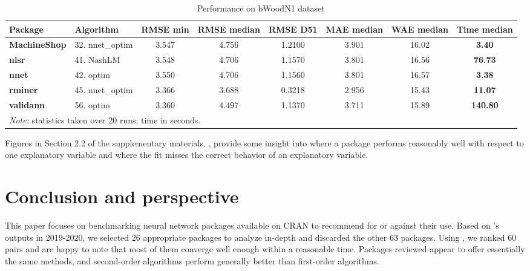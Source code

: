 \begin{Schunk}
\begin{table}

\caption{\label{tab:TOP10:bWoodN1}Performance on bWoodN1 dataset}
\centering
\fontsize{7}{9}\selectfont
\begin{tabular}[t]{>{}llccccc>{}c}
\toprule
Package & Algorithm & RMSE min & RMSE median & RMSE D51 & MAE median & WAE median & Time median\\
\midrule
\textbf{MachineShop} & 32. nnet\_optim & 3.547 & 4.756 & 1.2100 & 3.901 & 16.02 & \textbf{3.40}\\
\textbf{nlsr} & 41. NashLM & 3.548 & 4.706 & 1.1570 & 3.801 & 16.56 & \textbf{76.73}\\
\textbf{nnet} & 42. optim & 3.550 & 4.706 & 1.1560 & 3.801 & 16.57 & \textbf{3.38}\\
\textbf{rminer} & 45. nnet\_optim & 3.366 & 3.688 & 0.3218 & 2.956 & 15.43 & \textbf{11.07}\\
\textbf{validann} & 56. optim & 3.360 & 4.497 & 1.1370 & 3.711 & 15.89 & \textbf{140.80}\\
\bottomrule
\multicolumn{8}{l}{\rule{0pt}{1em}\textit{Note: } statistics taken over 20 runs; time in seconds.}\\
\end{tabular}
\end{table}

\end{Schunk}

Figures in Section 2.2 of the supplementary materials,
\citep{suppl:material:paper21}, provide some insight into where a
package performs reasonably well with respect to one explanatory
variable and where the fit misses the correct behavior of an explanatory
variable.

\hypertarget{conclusion-and-perspective}{%
\section{Conclusion and perspective}\label{conclusion-and-perspective}}

This paper focuses on benchmarking neural network packages available on
CRAN to recommend for or against their use. Based on 's
outputs in 2019-2020, we selected 26 appropriate packages to analyze
in-depth and discarded the other 63 packages. Using ,
we ranked 60  pairs and are happy to note that
most of them converge well enough within a reasonable time. Packages
reviewed appear to offer essentially the same methods, and second-order
algorithms perform generally better than first-order algorithms.

